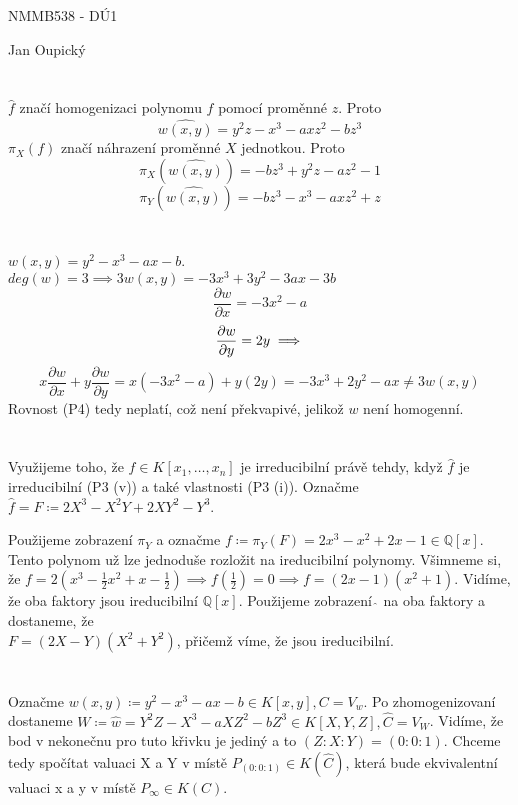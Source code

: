 \documentclass[12pt, a4paper]{article}
\begin{document}
\begin{center}
\large NMMB538 - DÚ1

\normalsize Jan Oupický
\end{center}
\vspace{1\baselineskip}

\section{}
$\hat{f}$ značí homogenizaci polynomu $f$ pomocí proměnné $z$. Proto
\[
\widehat{w(x,y)} = y^2 z - x^3 - a x z^2 - b z^3
\]
$\pi_X(f)$ značí náhrazení proměnné $X$ jednotkou. Proto
\[
\pi_X(\widehat{w(x,y)}) = - b z^3 + y^2 z - az^2 - 1
\]
\[
\pi_Y(\widehat{w(x,y)}) = - b z^3 - x^3 - a x z^2 + z
\]

\section{}
$w(x,y) = y^2-x^3-ax-b$. $deg(w) = 3 \implies 3w(x,y) = -3x^3+3y^2-3ax-3b$
\[
\frac{\partial w}{\partial x} = -3x^2-a
\]
\[
\frac{\partial w}{\partial y} = 2y\\\implies
\]
\[
x\frac{\partial w}{\partial x} + y\frac{\partial w}{\partial y} = x(-3x^2-a)+y(2y) = -3x^3+2y^2-ax \neq 3w(x,y)
\]
Rovnost (P4) tedy neplatí, což není překvapivé, jelikož $w$ není homogenní.

\section{}
Využijeme toho, že $f \in K[x_1,\dots,x_n]$ je irreducibilní právě tehdy, když $\hat{f}$ je irreducibilní (P3 (v)) a také vlastnosti (P3 (i)). Označme $\hat{f} = F \coloneqq 2X^3-X^2Y+2XY^2-Y^3$. 

Použijeme zobrazení $\pi_Y$ a označme $f \coloneqq \pi_Y(F) = 2x^3-x^2+2x-1 \in \mathbb{Q}[x]$. Tento polynom už lze jednoduše rozložit na ireducibilní polynomy. Všimneme si, že $f = 2(x^3-\frac{1}{2}x^2+x-\frac{1}{2}) \implies f(\frac{1}{2}) = 0 \implies f = (2x-1)(x^2+1)$. Vidíme, že oba faktory jsou ireducibilní $\mathbb{Q}[x]$. Použijeme zobrazení $\hat{\,}$ na oba faktory a dostaneme, že\\ $F = (2X-Y)(X^2+Y^2)$, přičemž víme, že jsou ireducibilní.

\section{}
Označme $w(x,y) \coloneqq y^2-x^3-ax-b \in K[x,y], C = V_w$. Po zhomogenizovaní dostaneme $W \coloneqq \hat{w} = Y^2Z - X^3 - aXZ^2 - bZ^3 \in K[X,Y,Z], \hat{C} = V_W$. Vidíme, že bod v nekonečnu pro tuto křivku je jediný a to $(Z:X:Y) = (0:0:1)$. Chceme tedy spočítat valuaci X a Y v místě $P_{(0:0:1)} \in K(\hat{C})$, která bude ekvivalentní valuaci x a y v místě $P_{\infty} \in K(C)$. 
\end{document}

